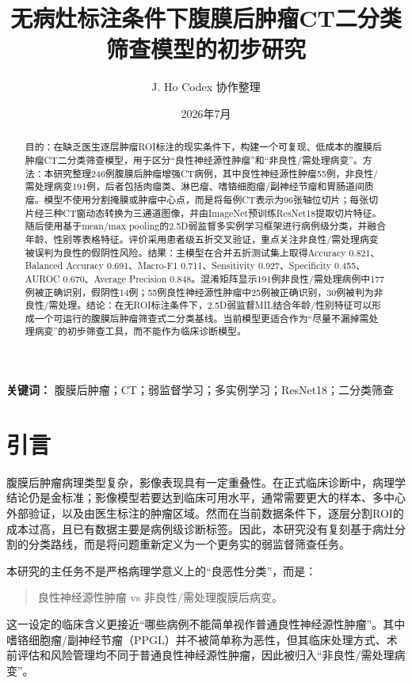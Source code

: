 \documentclass[UTF8,a4paper,11pt]{ctexart}
\title{\heiti 无病灶标注条件下腹膜后肿瘤CT二分类筛查模型的初步研究}
\author{J. Ho \quad Codex 协作整理}
\date{2026年7月}
\begin{document}
\maketitle

\begin{abstract}
目的：在缺乏医生逐层肿瘤ROI标注的现实条件下，构建一个可复现、低成本的腹膜后肿瘤CT二分类筛查模型，用于区分“良性神经源性肿瘤”和“非良性/需处理病变”。方法：本研究整理246例腹膜后肿瘤增强CT病例，其中良性神经源性肿瘤55例，非良性/需处理病变191例，后者包括肉瘤类、淋巴瘤、嗜铬细胞瘤/副神经节瘤和胃肠道间质瘤。模型不使用分割掩膜或肿瘤中心点，而是将每例CT表示为96张轴位切片；每张切片经三种CT窗动态转换为三通道图像，并由ImageNet预训练ResNet18提取切片特征。随后使用基于mean/max pooling的2.5D弱监督多实例学习框架进行病例级分类，并融合年龄、性别等表格特征。评价采用患者级五折交叉验证，重点关注非良性/需处理病变被误判为良性的假阴性风险。结果：主模型在合并五折测试集上取得Accuracy 0.821、Balanced Accuracy 0.691、Macro-F1 0.711、Sensitivity 0.927、Specificity 0.455、AUROC 0.670、Average Precision 0.848。混淆矩阵显示191例非良性/需处理病例中177例被正确识别，假阴性14例；55例良性神经源性肿瘤中25例被正确识别，30例被判为非良性/需处理。结论：在无ROI标注条件下，2.5D弱监督MIL结合年龄/性别特征可以形成一个可运行的腹膜后肿瘤筛查式二分类基线。当前模型更适合作为“尽量不漏掉需处理病变”的初步筛查工具，而不能作为临床诊断模型。
\end{abstract}

\noindent\textbf{关键词：} 腹膜后肿瘤；CT；弱监督学习；多实例学习；ResNet18；二分类筛查

\section{引言}

腹膜后肿瘤病理类型复杂，影像表现具有一定重叠性。在正式临床诊断中，病理学结论仍是金标准；影像模型若要达到临床可用水平，通常需要更大的样本、多中心外部验证，以及由医生标注的肿瘤区域。然而在当前数据条件下，逐层分割ROI的成本过高，且已有数据主要是病例级诊断标签。因此，本研究没有复刻基于病灶分割的分类路线，而是将问题重新定义为一个更务实的弱监督筛查任务。

本研究的主任务不是严格病理学意义上的“良恶性分类”，而是：

\begin{quote}
良性神经源性肿瘤 vs 非良性/需处理腹膜后病变。
\end{quote}

这一设定的临床含义更接近“哪些病例不能简单视作普通良性神经源性肿瘤”。其中嗜铬细胞瘤/副神经节瘤（PPGL）并不被简单称为恶性，但其临床处理方式、术前评估和风险管理均不同于普通良性神经源性肿瘤，因此被归入“非良性/需处理病变”。
\end{document}
